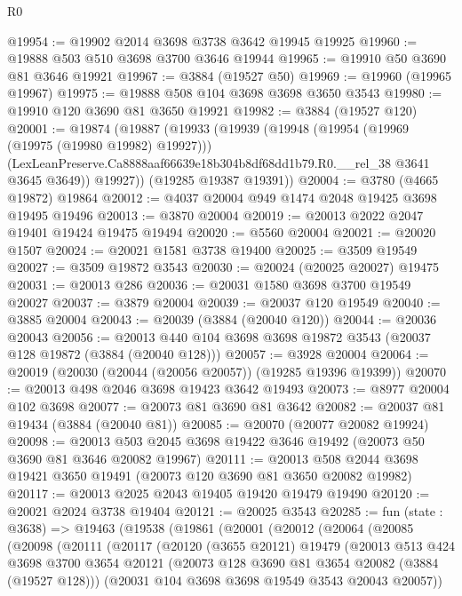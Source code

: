 \begin{lexlean}{R0}
\begin{coremodule}
@19954 := @19902 @2014 @3698 @3738 @3642 @19945 @19925
@19960 := @19888 @503 @510 @3698 @3700 @3646 @19944
@19965 := @19910 @50 @3690 @81 @3646 @19921
@19967 := @3884 (@19527 @50)
@19969 := @19960 (@19965 @19967)
@19975 := @19888 @508 @104 @3698 @3698 @3650 @3543
@19980 := @19910 @120 @3690 @81 @3650 @19921
@19982 := @3884 (@19527 @120)
@20001 := @19874
    (@19887
      (@19933
        (@19939
          (@19948
            (@19954 (@19969 (@19975 (@19980 @19982) @19927)))
            (LexLeanPreserve.Ca8888aaf66639e18b304b8df68dd1b79.R0.__rel_38 @3641 @3645 @3649))
          @19927))
      (@19285 @19387 @19391))
@20004 := @3780 (@4665 @19872) @19864
@20012 := @4037 @20004 @949 @1474 @2048 @19425 @3698 @19495 @19496
@20013 := @3870 @20004
@20019 := @20013 @2022 @2047 @19401 @19424 @19475 @19494
@20020 := @5560 @20004
@20021 := @20020 @1507
@20024 := @20021 @1581 @3738 @19400
@20025 := @3509 @19549
@20027 := @3509 @19872 @3543
@20030 := @20024 (@20025 @20027) @19475
@20031 := @20013 @286
@20036 := @20031 @1580 @3698 @3700 @19549 @20027
@20037 := @3879 @20004
@20039 := @20037 @120 @19549
@20040 := @3885 @20004
@20043 := @20039 (@3884 (@20040 @120))
@20044 := @20036 @20043
@20056 := @20013 @440 @104 @3698 @3698 @19872 @3543 (@20037 @128 @19872 (@3884 (@20040 @128)))
@20057 := @3928 @20004
@20064 := @20019 (@20030 (@20044 (@20056 @20057)) (@19285 @19396 @19399))
@20070 := @20013 @498 @2046 @3698 @19423 @3642 @19493
@20073 := @8977 @20004 @102 @3698
@20077 := @20073 @81 @3690 @81 @3642
@20082 := @20037 @81 @19434 (@3884 (@20040 @81))
@20085 := @20070 (@20077 @20082 @19924)
@20098 := @20013 @503 @2045 @3698 @19422 @3646 @19492 (@20073 @50 @3690 @81 @3646 @20082 @19967)
@20111 := @20013 @508 @2044 @3698 @19421 @3650 @19491 (@20073 @120 @3690 @81 @3650 @20082 @19982)
@20117 := @20013 @2025 @2043 @19405 @19420 @19479 @19490
@20120 := @20021 @2024 @3738 @19404
@20121 := @20025 @3543
@20285 := fun (state : @3638) =>
  @19463
    (@19538
      (@19861
        (@20001
          (@20012
            (@20064
              (@20085
                (@20098
                  (@20111
                    (@20117
                      (@20120
                        (@3655 @20121)
                        @19479
                        (@20013
                          @513
                          @424
                          @3698
                          @3700
                          @3654
                          @20121
                          (@20073 @128 @3690 @81 @3654 @20082 (@3884 (@19527 @128)))
                          (@20031 @104 @3698 @3698 @19549 @3543 @20043 @20057))

\end{coremodule}
\end{lexlean}
